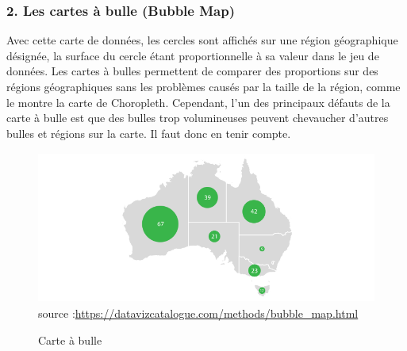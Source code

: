 \documentclass[french, a4paper, 12pt]{report}
\begin{document}
\subsubsection{2. Les cartes à bulle (Bubble Map)}
Avec cette carte de données, les cercles sont affichés sur une région géographique désignée, la surface du cercle étant proportionnelle à sa valeur dans le jeu de données. Les cartes à bulles permettent de comparer des proportions sur des régions géographiques sans les problèmes causés par la taille de la région, comme le montre la carte de Choropleth. Cependant, l'un des principaux défauts de la carte à bulle est que des bulles trop volumineuses peuvent chevaucher d'autres bulles et régions sur la carte. Il faut donc en tenir compte.
\begin{figure}[!ht]
    \centering
    \includegraphics[height=5cm]{images/bubble_map.png}
    \scriptsize{source :\url{https://datavizcatalogue.com/methods/bubble_map.html}}
    \caption{Carte à bulle \footnotemark}
    \label{fig:2.5}
\end{figure}
\end{document}
